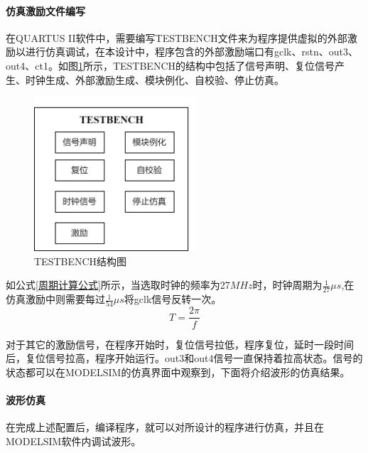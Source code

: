 \paragraph{仿真激励文件编写}
在QUARTUS II软件中，需要编写TESTBENCH文件来为程序提供虚拟的外部激励以进行仿真调试，在本设计中，程序包含的外部激励端口有gclk、rstn、out3、out4、ct1。如图\ref{TESTBENCH结构图}所示，TESTBENCH的结构中包括了信号声明、复位信号产生、时钟生成、外部激励生成、模块例化、自校验、停止仿真。\par
\begin{figure}[ht]
	\centering
	\includegraphics[width=6cm]{figure/TESTBENCH structure.png}
	\caption{TESTBENCH结构图}
	\label{TESTBENCH结构图}
\end{figure}
如公式\ref{周期计算公式}所示，当选取时钟的频率为27$MHz$时，时钟周期为$\frac{1}{27}\mu s$,在仿真激励中则需要每过$\frac{1}{54}
\mu s$将gclk信号反转一次。
\begin{equation}
	T=\frac{2\pi}{f}
	\label{周期计算公式}
\end{equation}\par
对于其它的激励信号，在程序开始时，复位信号拉低，程序复位，延时一段时间后，复位信号拉高，程序开始运行。out3和out4信号一直保持着拉高状态。信号的状态都可以在MODELSIM的仿真界面中观察到，下面将介绍波形的仿真结果。

\newpage
\paragraph{波形仿真}
在完成上述配置后，编译程序，就可以对所设计的程序进行仿真，并且在MODELSIM软件内调试波形。


